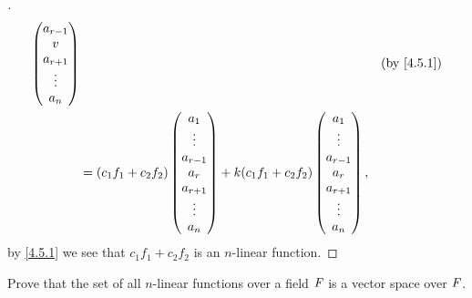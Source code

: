 \begin{proof}[]
\begin{align*}
\begin{pmatrix}
                                                 a_{r - 1} \\
                                                 v         \\
                                                 a_{r + 1} \\
                                                 \vdots    \\
                                                 a_n
                                               \end{pmatrix}             &  & \by{4.5.1} \\
     & = (c_1 f_1 + c_2 f_2)\begin{pmatrix}
                              a_1       \\
                              \vdots    \\
                              a_{r - 1} \\
                              a_r       \\
                              a_{r + 1} \\
                              \vdots    \\
                              a_n
                            \end{pmatrix} + k (c_1 f_1 + c_2 f_2)\begin{pmatrix}
                                                                   a_1       \\
                                                                   \vdots    \\
                                                                   a_{r - 1} \\
                                                                   a_r       \\
                                                                   a_{r + 1} \\
                                                                   \vdots    \\
                                                                   a_n
                                                                 \end{pmatrix},
  \end{align*}
  by \cref{4.5.1} we see that \(c_1 f_1 + c_2 f_2\) is an \(n\)-linear function.
\end{proof}

\begin{ex}\label{ex:4.5.18}
  Prove that the set of all \(n\)-linear functions over a field \(\mathit{F}\) is a vector space over \(\mathit{F}\).
\end{ex}

